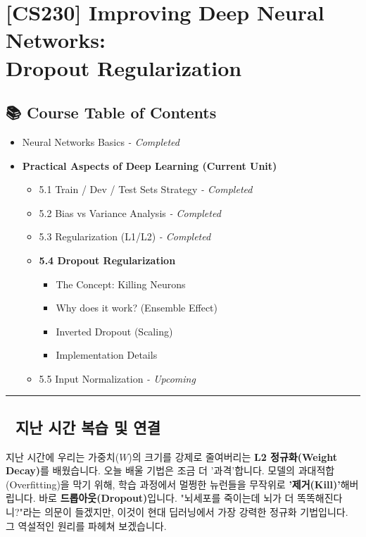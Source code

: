 \documentclass[11pt,a4paper]{book}
\theoremstyle{definition}
\begin{document}
\chapter{[CS230] Improving Deep Neural Networks: \\ Dropout Regularization}
\label{ch:lecture14}

\section*{📚 Course Table of Contents}
\begin{itemize}
    \item[Chapter 1-4.] Neural Networks Basics \textit{- Completed}
    \item[\textbf{Chapter 5.}] \textbf{Practical Aspects of Deep Learning (Current Unit)}
    \begin{itemize}
        \item 5.1 Train / Dev / Test Sets Strategy \textit{- Completed}
        \item 5.2 Bias vs Variance Analysis \textit{- Completed}
        \item 5.3 Regularization (L1/L2) \textit{- Completed}
        \item \textbf{5.4 Dropout Regularization}
        \begin{itemize}
            \item The Concept: Killing Neurons
            \item Why does it work? (Ensemble Effect)
            \item Inverted Dropout (Scaling)
            \item Implementation Details
        \end{itemize}
        \item 5.5 Input Normalization \textit{- Upcoming}
    \end{itemize}
\end{itemize}

\vspace{0.5cm}
\hrule
\vspace{0.5cm}

\section*{🔗 지난 시간 복습 및 연결}
지난 시간에 우리는 가중치($W$)의 크기를 강제로 줄여버리는 \textbf{L2 정규화(Weight Decay)}를 배웠습니다.
오늘 배울 기법은 조금 더 '과격'합니다. 모델의 과대적합(Overfitting)을 막기 위해, 학습 과정에서 멀쩡한 뉴런들을 무작위로 \textbf{'제거(Kill)'}해버립니다. 바로 \textbf{드롭아웃(Dropout)}입니다.
"뇌세포를 죽이는데 뇌가 더 똑똑해진다니?"라는 의문이 들겠지만, 이것이 현대 딥러닝에서 가장 강력한 정규화 기법입니다. 그 역설적인 원리를 파헤쳐 보겠습니다.
\end{document}
